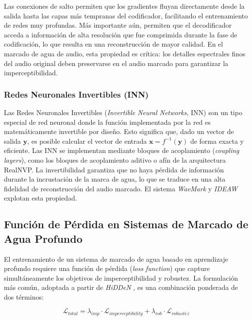 Las conexiones de salto permiten que los gradientes fluyan directamente desde la salida hasta las capas más tempranas del codificador, facilitando el entrenamiento de redes muy profundas. Más importante aún, permiten que el decodificador acceda a información de alta resolución que fue comprimida durante la fase de codificación, lo que resulta en una reconstrucción de mayor calidad. En el marcado de agua de audio, esta propiedad es crítica: los detalles espectrales finos del audio original deben preservarse en el audio marcado para garantizar la imperceptibilidad.

\subsubsection{Redes Neuronales Invertibles (INN)}

Las Redes Neuronales Invertibles (\textit{Invertible Neural Networks}, INN) son un tipo especial de red neuronal donde la función implementada por la red es matemáticamente invertible por diseño. Esto significa que, dado un vector de salida $\mathbf{y}$, es posible calcular el vector de entrada $\mathbf{x} = f^{-1}(\mathbf{y})$ de forma exacta y eficiente. Las INN se implementan mediante bloques de acoplamiento (\textit{coupling layers}), como los bloques de acoplamiento aditivo o afín de la arquitectura RealNVP. La invertibilidad garantiza que no haya pérdida de información durante la incrustación de la marca de agua, lo que se traduce en una alta fidelidad de reconstrucción del audio marcado. El sistema \textit{WavMark} \cite{chen2023wavmark} y \textit{IDEAW} \cite{li2024ideaw} explotan esta propiedad.

\subsection{Función de Pérdida en Sistemas de Marcado de Agua Profundo}
\label{sec:loss_function}

El entrenamiento de un sistema de marcado de agua basado en aprendizaje profundo requiere una función de pérdida (\textit{loss function}) que capture simultáneamente los objetivos de imperceptibilidad y robustez. La formulación más común, adoptada a partir de \textit{HiDDeN} \cite{zhu2018hidden}, es una combinación ponderada de dos términos:

\begin{equation}
    \mathcal{L}_{total} = \lambda_{imp} \cdot \mathcal{L}_{imperceptibility} + \lambda_{rob} \cdot \mathcal{L}_{robustez}
\end{equation}

